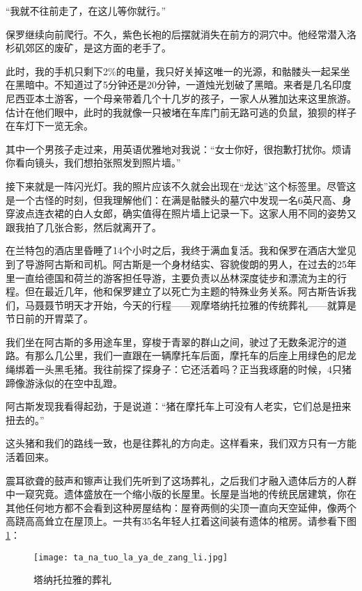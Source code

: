 \documentclass[12pt,oneside]{book}
\begin{document}
\begin{bookref}[frametitle={\cite{好好告别}}]
“我就不往前走了，在这儿等你就行。”

保罗继续向前爬行。不久，紫色长袍的后摆就消失在前方的洞穴中。他经常潜入洛杉矶郊区的废矿，是这方面的老手了。

此时，我的手机只剩下2\%的电量，我只好关掉这唯一的光源，和骷髅头一起呆坐在黑暗中。不知道过了5分钟还是20分钟，一道烛光划破了黑暗。来者是几名印度尼西亚本土游客，一个母亲带着几个十几岁的孩子，一家人从雅加达来这里旅游。估计在他们眼中，此时的我就像一只被堵在车库门前无路可逃的负鼠，狼狈的样子在车灯下一览无余。

其中一个男孩子走过来，用英语优雅地对我说：“女士你好，很抱歉打扰你。烦请你看向镜头，我们想拍张照发到照片墙。”

接下来就是一阵闪光灯。我的照片应该不久就会出现在“龙达”这个标签里。尽管这是一个古怪的时刻，但我理解他们：在满是骷髅头的墓穴中发现一名6英尺高、身穿波点连衣裙的白人女郎，确实值得在照片墙上记录一下。这家人用不同的姿势又跟我拍了几张合影，然后就离开了。

在兰特包的酒店里昏睡了14个小时之后，我终于满血复活。我和保罗在酒店大堂见到了导游阿古斯和司机。阿古斯是一个身材结实、容貌俊朗的男人，在过去的25年里一直给德国和荷兰的游客担任导游，主要负责以丛林深度徒步和漂流为主的行程。但在最近几年，他和保罗建立了以死亡为主题的特殊业务关系。阿古斯告诉我们，马聂聂节明天才开始，今天的行程——观摩塔纳托拉雅的传统葬礼——就算是节日前的开胃菜了。

我们坐在阿古斯的多用途车里，穿梭于青翠的群山之间，驶过了无数条泥泞的道路。有那么几公里，我们一直跟在一辆摩托车后面，摩托车的后座上用绿色的尼龙绳绑着一头黑毛猪。我往前探了探身子：它还活着吗？正当我琢磨的时候，4只猪蹄像游泳似的在空中乱蹬。

阿古斯发现我看得起劲，于是说道：“猪在摩托车上可没有人老实，它们总是扭来扭去的。”

这头猪和我们的路线一致，也是往葬礼的方向走。这样看来，我们双方只有一方能活着回来。

震耳欲聋的鼓声和镲声让我们先听到了这场葬礼，之后我们才融入遗体后方的人群中一窥究竟。遗体盛放在一个缩小版的长屋里。长屋是当地的传统民居建筑，你在其他任何地方都不会看到这种房屋结构：屋脊两侧的尖顶一直向天空延伸，像两个高跷高高耸立在屋顶上。一共有35名年轻人扛着这间装有遗体的棺房。请参看下图\ref{fig:ta_na_tuo_la_ya_de_zang_li}：

\begin{figure}[H]
\centering
\texttt{[image: ta\_na\_tuo\_la\_ya\_de\_zang\_li.jpg]}
\caption{塔纳托拉雅的葬礼}
\label{fig:ta_na_tuo_la_ya_de_zang_li}
\end{figure}


\end{bookref}
\end{document}
